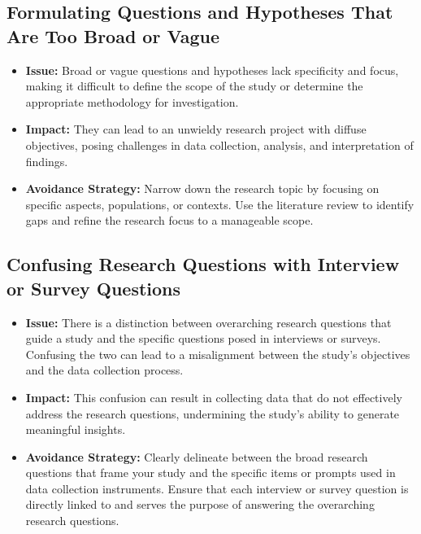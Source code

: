 \documentclass[
]{book}
\begin{document}
\hypertarget{formulating-questions-and-hypotheses-that-are-too-broad-or-vague}{%
\subsection*{Formulating Questions and Hypotheses That Are Too Broad or Vague}\label{formulating-questions-and-hypotheses-that-are-too-broad-or-vague}}

\begin{itemize}
\item
  \textbf{Issue:} Broad or vague questions and hypotheses lack specificity and focus, making it difficult to define the scope of the study or determine the appropriate methodology for investigation.
\item
  \textbf{Impact:} They can lead to an unwieldy research project with diffuse objectives, posing challenges in data collection, analysis, and interpretation of findings.
\item
  \textbf{Avoidance Strategy:} Narrow down the research topic by focusing on specific aspects, populations, or contexts. Use the literature review to identify gaps and refine the research focus to a manageable scope.
\end{itemize}

\hypertarget{confusing-research-questions-with-interview-or-survey-questions}{%
\subsection*{Confusing Research Questions with Interview or Survey Questions}\label{confusing-research-questions-with-interview-or-survey-questions}}

\begin{itemize}
\item
  \textbf{Issue:} There is a distinction between overarching research questions that guide a study and the specific questions posed in interviews or surveys. Confusing the two can lead to a misalignment between the study's objectives and the data collection process.
\item
  \textbf{Impact:} This confusion can result in collecting data that do not effectively address the research questions, undermining the study's ability to generate meaningful insights.
\item
  \textbf{Avoidance Strategy:} Clearly delineate between the broad research questions that frame your study and the specific items or prompts used in data collection instruments. Ensure that each interview or survey question is directly linked to and serves the purpose of answering the overarching research questions.
\end{itemize}
\end{document}

